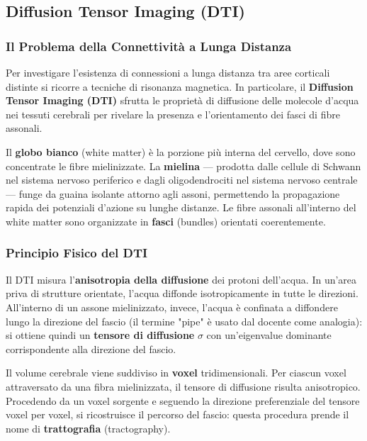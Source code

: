 \subsection{Diffusion Tensor Imaging (DTI)}

\subsubsection{Il Problema della Connettività a Lunga Distanza}

Per investigare l'esistenza di connessioni a lunga distanza tra aree corticali distinte si ricorre a tecniche di risonanza magnetica. In particolare, il \textbf{Diffusion Tensor Imaging (DTI)} sfrutta le proprietà di diffusione delle molecole d'acqua nei tessuti cerebrali per rivelare la presenza e l'orientamento dei fasci di fibre assonali.

Il \textbf{globo bianco} (white matter) è la porzione più interna del cervello, dove sono concentrate le fibre mielinizzate. La \textbf{mielina} — prodotta dalle cellule di Schwann nel sistema nervoso periferico e dagli oligodendrociti nel sistema nervoso centrale — funge da guaina isolante attorno agli assoni, permettendo la propagazione rapida dei potenziali d'azione su lunghe distanze. Le fibre assonali all'interno del white matter sono organizzate in \textbf{fasci} (bundles) orientati coerentemente.

\subsubsection{Principio Fisico del DTI}

Il DTI misura l'\textbf{anisotropia della diffusione} dei protoni dell'acqua. In un'area priva di strutture orientate, l'acqua diffonde isotropicamente in tutte le direzioni. All'interno di un assone mielinizzato, invece, l'acqua è confinata a diffondere lungo la direzione del fascio (il termine "pipe" è usato dal docente come analogia): si ottiene quindi un \textbf{tensore di diffusione} $\sigma$ con un'eigenvalue dominante corrispondente alla direzione del fascio.

Il volume cerebrale viene suddiviso in \textbf{voxel} tridimensionali. Per ciascun voxel attraversato da una fibra mielinizzata, il tensore di diffusione risulta anisotropico. Procedendo da un voxel sorgente e seguendo la direzione preferenziale del tensore voxel per voxel, si ricostruisce il percorso del fascio: questa procedura prende il nome di \textbf{trattografia} (tractography).

